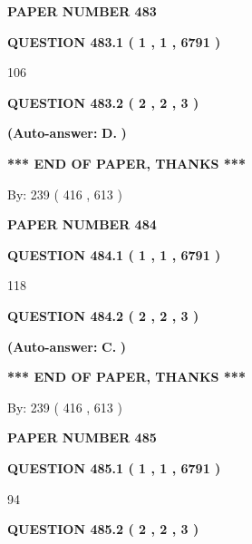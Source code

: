 \documentclass[12pt]{article}
\begin{document}
   
\newpage 
\setcounter{page}{ 
   483001 } 
   
   
 {\textbf{ \Large{ PAPER NUMBER  483  }}}
   
   
   
   
  
  
{\textbf{\large{QUESTION
483.1 
 ( 1 , 1 , 6791 )
}}}

106
  
  
{\textbf{\large{QUESTION
483.2 
 ( 2 , 2 , 3 )
}}}
 
 
{\textbf{(Auto-answer:}}
{\textbf{\large{
D.}}}
{\textbf{)}}
 
 
   
   
   
   
\vspace{1.0in} 
{\textbf{\large{ *** END OF PAPER, THANKS *** }}} 
   
   
\hspace{1.0in} By: 
 239 ( 416 ,  613 )
   
   
   
   
\newpage 
\setcounter{page}{ 
   484001 } 
   
   
 {\textbf{ \Large{ PAPER NUMBER  484  }}}
   
   
   
   
  
  
{\textbf{\large{QUESTION
484.1 
 ( 1 , 1 , 6791 )
}}}

118
  
  
{\textbf{\large{QUESTION
484.2 
 ( 2 , 2 , 3 )
}}}
 
 
{\textbf{(Auto-answer:}}
{\textbf{\large{
C.}}}
{\textbf{)}}
 
 
   
   
   
   
\vspace{1.0in} 
{\textbf{\large{ *** END OF PAPER, THANKS *** }}} 
   
   
\hspace{1.0in} By: 
 239 ( 416 ,  613 )
   
   
   
   
\newpage 
\setcounter{page}{ 
   485001 } 
   
   
 {\textbf{ \Large{ PAPER NUMBER  485  }}}
   
   
   
   
  
  
{\textbf{\large{QUESTION
485.1 
 ( 1 , 1 , 6791 )
}}}

94
  
  
{\textbf{\large{QUESTION
485.2 
 ( 2 , 2 , 3 )
}}}
 
\end{document}
